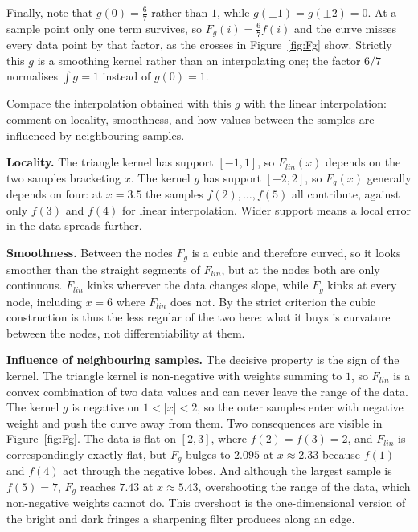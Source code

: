 \documentclass[11pt]{article}
\begin{document}
Finally, note that $g(0) = \tfrac{6}{7}$ rather than $1$, while
$g(\pm1)=g(\pm2)=0$. At a sample point only one term survives, so
$F_g(i) = \tfrac{6}{7} f(i)$ and the curve misses every data point by that
factor, as the crosses in Figure~\ref{fig:Fg} show. Strictly this $g$ is a
smoothing kernel rather than an interpolating one; the factor $6/7$ normalises
$\int g = 1$ instead of $g(0)=1$.

\begin{question}
Compare the interpolation obtained with this $g$ with the linear
interpolation: comment on locality, smoothness, and how values between the
samples are influenced by neighbouring samples.
\end{question}

\textbf{Locality.} The triangle kernel has support $[-1,1]$, so $F_{lin}(x)$
depends on the two samples bracketing $x$. The kernel $g$ has support
$[-2,2]$, so $F_g(x)$ generally depends on four: at $x=3.5$ the samples
$f(2),\dots,f(5)$ all contribute, against only $f(3)$ and $f(4)$ for linear
interpolation. Wider support means a local error in the data spreads further.

\textbf{Smoothness.} Between the nodes $F_g$ is a cubic and therefore curved,
so it looks smoother than the straight segments of $F_{lin}$, but at the nodes
both are only continuous. $F_{lin}$ kinks wherever the data changes slope,
while $F_g$ kinks at every node, including $x=6$ where $F_{lin}$ does not. By
the strict criterion the cubic construction is thus the less regular of the
two here: what it buys is curvature between the nodes, not differentiability
at them.

\textbf{Influence of neighbouring samples.} The decisive property is the sign
of the kernel. The triangle kernel is non-negative with weights summing to
$1$, so $F_{lin}$ is a convex combination of two data values and can never
leave the range of the data. The kernel $g$ is negative on $1 < |x| < 2$, so
the outer samples enter with negative weight and push the curve away from
them. Two consequences are visible in Figure~\ref{fig:Fg}. The data is flat on
$[2,3]$, where $f(2)=f(3)=2$, and $F_{lin}$ is correspondingly exactly flat,
but $F_g$ bulges to $2.095$ at $x \approx 2.33$ because $f(1)$ and $f(4)$ act
through the negative lobes. And although the largest sample is $f(5)=7$,
$F_g$ reaches $7.43$ at $x \approx 5.43$, overshooting the range of the data,
which non-negative weights cannot do. This overshoot is the one-dimensional
version of the bright and dark fringes a sharpening filter produces along an
edge.
\end{document}
